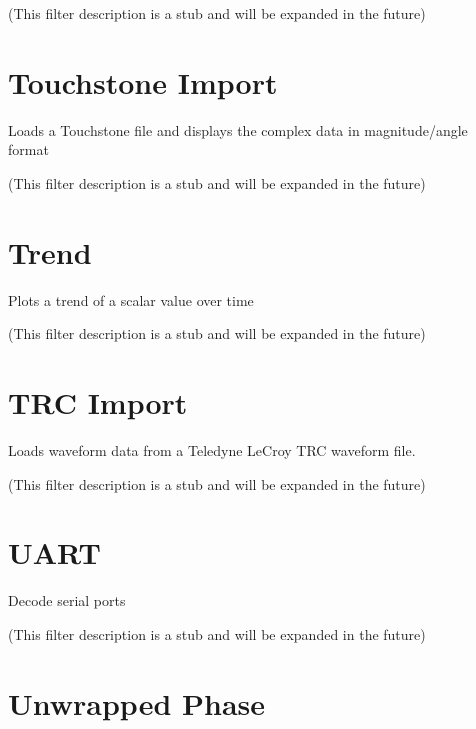 (This filter description is a stub and will be expanded in the future)

\pagebreak
\section{Touchstone Import}

Loads a Touchstone file and displays the complex data in magnitude/angle format

(This filter description is a stub and will be expanded in the future)

\pagebreak
\section{Trend}

Plots a trend of a scalar value over time

(This filter description is a stub and will be expanded in the future)

\pagebreak
\section{TRC Import}

Loads waveform data from a Teledyne LeCroy TRC waveform file.

(This filter description is a stub and will be expanded in the future)

\pagebreak
\section{UART}

Decode serial ports

(This filter description is a stub and will be expanded in the future)

\pagebreak
\section{Unwrapped Phase}

